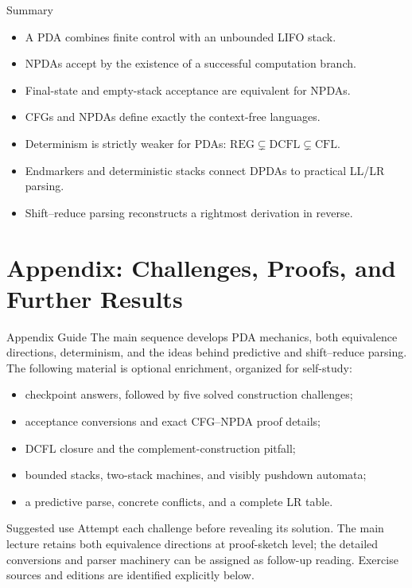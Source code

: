 \documentclass[10pt]{beamer}
\begin{document}
\begin{frame}{Summary}
  \begin{itemize}
    \item A PDA combines finite control with an unbounded LIFO stack.
    \item NPDAs accept by the existence of a successful computation branch.
    \item Final-state and empty-stack acceptance are equivalent for NPDAs.
    \item CFGs and NPDAs define exactly the context-free languages.
    \item Determinism is strictly weaker for PDAs: $\mathrm{REG}\subsetneq\mathrm{DCFL}\subsetneq\mathrm{CFL}$.
    \item Endmarkers and deterministic stacks connect DPDAs to practical LL/LR parsing.
    \item Shift--reduce parsing reconstructs a rightmost derivation in reverse.
  \end{itemize}
\end{frame}

\appendix
\section{Appendix: Challenges, Proofs, and Further Results}

\begin{frame}{Appendix Guide}
  \small
  The main sequence develops PDA mechanics, both equivalence directions,
  determinism, and the ideas behind predictive and shift--reduce parsing.
  The following material is optional enrichment, organized for self-study:
  \begin{itemize}
    \item checkpoint answers, followed by five solved construction challenges;
    \item acceptance conversions and exact CFG--NPDA proof details;
    \item DCFL closure and the complement-construction pitfall;
    \item bounded stacks, two-stack machines, and visibly pushdown automata;
    \item a predictive parse, concrete conflicts, and a complete LR table.
  \end{itemize}
  \begin{block}{Suggested use}
    Attempt each challenge before revealing its solution. The main lecture
    retains both equivalence directions at proof-sketch level; the detailed
    conversions and parser machinery can be assigned as follow-up reading.
    Exercise sources and editions are identified explicitly below.
  \end{block}
\end{frame}
\end{document}
